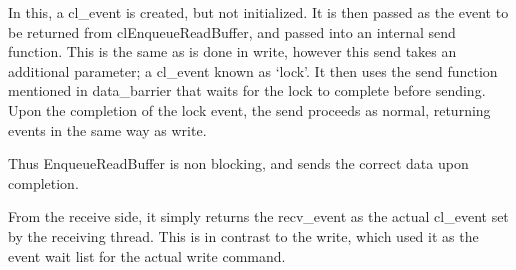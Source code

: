 \documentclass[../thesis.tex]{subfiles}
\begin{document}
            In this, a cl\_event is created, but not initialized. It is then passed as the event to be returned from clEnqueueReadBuffer, and passed into an internal send function. This is the same as is done in write, however this send takes an additional parameter; a cl\_event known as `lock'. It then uses the send function mentioned in data\_barrier that waits for the lock to complete before sending. Upon the completion of the lock event, the send proceeds as normal, returning events in the same way as write.

            Thus EnqueueReadBuffer is non blocking, and sends the correct data upon completion.

            From the receive side, it simply returns the recv\_event as the actual cl\_event set by the receiving thread. This is in contrast to the write, which used it as the event wait list for the actual write command.
    

\end{document}
